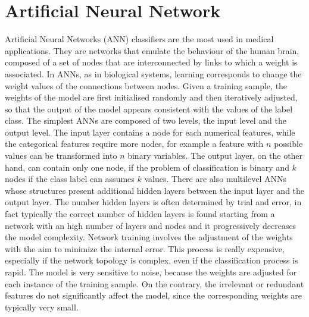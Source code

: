 \documentclass[final,a4paper,12pt,english]{UnicaPhdThesis3}
\begin{document}
\section{Artificial Neural Network} \label{ANN}
Artificial Neural Networks (\acs{ANN}) classifiers are the most used in medical applications. They are networks that emulate the behaviour of the human brain, composed of a set of nodes that are interconnected by links to which a weight is associated. In ANNs, as in biological systems, learning corresponds to change the weight values of the connections between nodes. Given a training sample, the weights of the model are first initialised randomly and then iteratively adjusted, so that the output of the model appears consistent with the values of the label class. The simplest ANNs are composed of two levels, the input level and the output level. The input layer contains a node for each numerical features, while the categorical features require more nodes, for example a feature with $n$ possible values can be transformed into $n$ binary variables. The output layer, on the other hand, can contain only one node, if the problem of classification is binary and $k$ nodes if the class label can assumes $k$ values. There are also multilevel ANNs whose structures present additional hidden layers between the input layer and the output layer. The number hidden layers is often determined by trial and error, in fact typically the correct number of hidden layers is found starting from a network with an high number of layers and nodes and it progressively decreases the model complexity. Network training involves the adjustment of the weights with the aim to minimize the internal error. This process is really expensive, especially if the network topology is complex, even if the classification process is rapid. The model is very sensitive to noise, because the weights are adjusted for each instance of the training sample. On the contrary, the irrelevant or redundant  features do not significantly affect the model, since the corresponding weights are typically very small.
\end{document}
